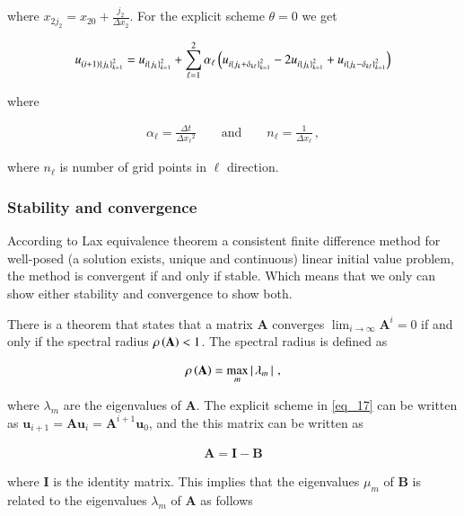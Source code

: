 \documentclass[11pt,english,a4paper]{article}
\begin{document}
\begin{flushleft}
where $x_{2 j_2} = x_{2 0}  + \frac{j_2}{\Delta x_2}$. For the explicit scheme $\theta = 0$ we get

\begin{align}
u_{(i+1)\left\lbrace{j_k}\right\rbrace_{k=1}^2} = u_{i\left\lbrace{j_k}\right\rbrace_{k=1}^2} + \sum_{\ell=1}^2 \alpha_\ell\left({u_{i\left\lbrace{j_k+\delta_{k\ell}}\right\rbrace_{k=1}^2} - 2u_{i\left\lbrace{j_k}\right\rbrace_{k=1}^2} +u_{i\left\lbrace{j_k-\delta_{k\ell}}\right\rbrace_{k=1}^2}}\right)
\label{eq_17}
\end{align}

where

\begin{align*}
\alpha_\ell = \frac{\Delta t}{\Delta {x_\ell}^2} \qquad \text{and} \qquad n_\ell = \frac{1}{\Delta x_\ell} \,,
\end{align*}

where $n_\ell$ is number of grid points in $\ell$ direction. 

\subsubsection{Stability and convergence} \label{sec_explicit_stab_conv}

According to Lax equivalence theorem a consistent finite difference method for well-posed  (a solution exists, unique and continuous) linear initial value problem, the method is convergent if and only if stable. Which means that we only can show either stability and convergence to show both. \linebreak

There is a theorem that states that a matrix $\textbf{A}$ converges $\lim_{i\to\infty} \textbf{A}^i = 0$ if and only if the spectral radius $\rho\left({\textbf{A}}\right) < 1$. The spectral radius is defined as

\begin{align*}
\rho\left({\textbf{A}}\right) = \max_m \left\vert{\,\lambda_m\,}\right\vert \,,
\end{align*}

where $\lambda_m$ are the eigenvalues of $\textbf{A}$. The explicit scheme in \eqref{eq_17}  can be written as $\textbf{u}_{i+1} = \textbf{A}\textbf{u}_i = \textbf{A}^{i+1}\textbf{u}_0$, and the this matrix can be written as

\begin{align*}
\textbf{A} = \textbf{I} - \textbf{B}
\end{align*}

where $\textbf{I}$ is the identity matrix. This implies that the eigenvalues $\mu_m$ of $\textbf{B}$ is related to the eigenvalues $\lambda_m$ of $\textbf{A}$ as follows


\end{flushleft}
\end{document}

